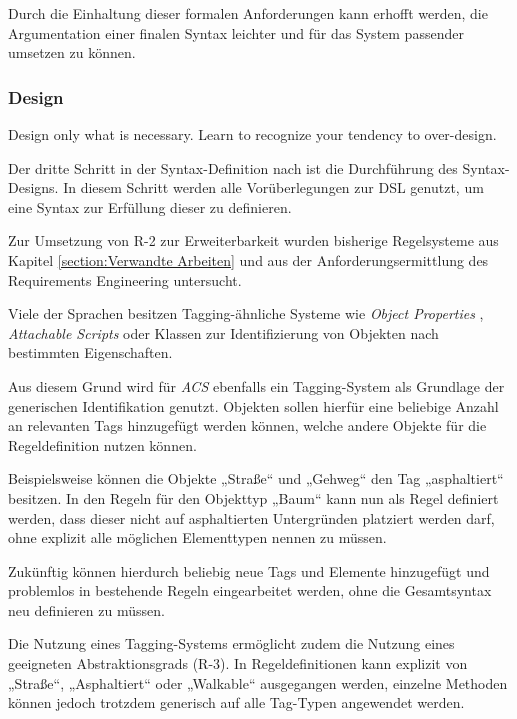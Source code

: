 \medskip

Durch die Einhaltung dieser formalen Anforderungen kann erhofft werden, die Argumentation einer finalen Syntax leichter und für das System passender umsetzen zu können.

\subsubsection{Design}

\epigraph{Design only what is necessary. Learn to recognize your tendency to over-design.}{\textcite[S. 327]{mernikWhenHowDevelop2005}}

Der dritte Schritt in der Syntax-Definition nach \textcite{mernikWhenHowDevelop2005} ist die Durchführung des Syntax-Designs. In diesem Schritt werden alle Vorüberlegungen zur DSL genutzt, um eine Syntax zur Erfüllung dieser zu definieren.

\medskip

Zur Umsetzung von R-2 zur Erweiterbarkeit wurden bisherige Regelsysteme aus Kapitel \ref{section:Verwandte Arbeiten} und aus der Anforderungsermittlung des Requirements Engineering untersucht.

Viele der Sprachen besitzen Tagging-ähnliche Systeme wie \textit{Object Properties} \parencite{sydoraRulebasedComplianceChecking2020}, \textit{Attachable Scripts} \parencite{vassionInvestigatingConstrainedObjects2023a} oder Klassen \parencite{xuMethodologyModelling3D2017} zur Identifizierung von Objekten nach bestimmten Eigenschaften.

Aus diesem Grund wird für \textit{ACS} ebenfalls ein Tagging-System als Grundlage der generischen Identifikation genutzt. Objekten sollen hierfür eine beliebige Anzahl an relevanten Tags hinzugefügt werden können, welche andere Objekte für die Regeldefinition nutzen können.

Beispielsweise können die Objekte „Straße“ und „Gehweg“ den Tag „asphaltiert“ besitzen. In den Regeln für den Objekttyp „Baum“ kann nun als Regel definiert werden, dass dieser nicht auf asphaltierten Untergründen platziert werden darf, ohne explizit alle möglichen Elementtypen nennen zu müssen.

Zukünftig können hierdurch beliebig neue Tags und Elemente hinzugefügt und problemlos in bestehende Regeln eingearbeitet werden, ohne die Gesamtsyntax neu definieren zu müssen.

Die Nutzung eines Tagging-Systems ermöglicht zudem die Nutzung eines geeigneten Abstraktionsgrads (R-3). In Regeldefinitionen kann explizit von „Straße“, „Asphaltiert“ oder „Walkable“ ausgegangen werden, einzelne Methoden können jedoch trotzdem generisch auf alle Tag-Typen angewendet werden.

